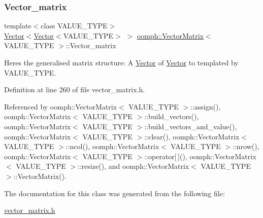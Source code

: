 \subsubsection{\texorpdfstring{Vector\+\_\+matrix}{Vector\_matrix}}
{\footnotesize\ttfamily template$<$class V\+A\+L\+U\+E\+\_\+\+T\+Y\+PE$>$ \\
\hyperlink{classoomph_1_1Vector}{Vector}$<$\hyperlink{classoomph_1_1Vector}{Vector}$<$V\+A\+L\+U\+E\+\_\+\+T\+Y\+PE$>$ $>$ \hyperlink{classoomph_1_1VectorMatrix}{oomph\+::\+Vector\+Matrix}$<$ V\+A\+L\+U\+E\+\_\+\+T\+Y\+PE $>$\+::Vector\+\_\+matrix\hspace{0.3cm}{\ttfamily [protected]}}

Here\textquotesingle{}s the generalised matrix structure\+: A \hyperlink{classoomph_1_1Vector}{Vector} of \hyperlink{classoomph_1_1Vector}{Vector} to templated by V\+A\+L\+U\+E\+\_\+\+T\+Y\+PE. 

Definition at line 260 of file vector\+\_\+matrix.\+h.



Referenced by oomph\+::\+Vector\+Matrix$<$ V\+A\+L\+U\+E\+\_\+\+T\+Y\+P\+E $>$\+::assign(), oomph\+::\+Vector\+Matrix$<$ V\+A\+L\+U\+E\+\_\+\+T\+Y\+P\+E $>$\+::build\+\_\+vectors(), oomph\+::\+Vector\+Matrix$<$ V\+A\+L\+U\+E\+\_\+\+T\+Y\+P\+E $>$\+::build\+\_\+vectors\+\_\+and\+\_\+value(), oomph\+::\+Vector\+Matrix$<$ V\+A\+L\+U\+E\+\_\+\+T\+Y\+P\+E $>$\+::clear(), oomph\+::\+Vector\+Matrix$<$ V\+A\+L\+U\+E\+\_\+\+T\+Y\+P\+E $>$\+::ncol(), oomph\+::\+Vector\+Matrix$<$ V\+A\+L\+U\+E\+\_\+\+T\+Y\+P\+E $>$\+::nrow(), oomph\+::\+Vector\+Matrix$<$ V\+A\+L\+U\+E\+\_\+\+T\+Y\+P\+E $>$\+::operator\mbox{[}$\,$\mbox{]}(), oomph\+::\+Vector\+Matrix$<$ V\+A\+L\+U\+E\+\_\+\+T\+Y\+P\+E $>$\+::resize(), and oomph\+::\+Vector\+Matrix$<$ V\+A\+L\+U\+E\+\_\+\+T\+Y\+P\+E $>$\+::\+Vector\+Matrix().



The documentation for this class was generated from the following file\+:\begin{DoxyCompactItemize}
\item 
\hyperlink{vector__matrix_8h}{vector\+\_\+matrix.\+h}\end{DoxyCompactItemize}
